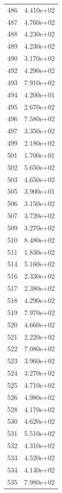 \documentclass[12pt]{article}
\begin{document}
\begin{longtable}{@{}cc@{}}
486 & 4.410e+02 \\
487 & 4.760e+02 \\
488 & 4.230e+02 \\
489 & 4.230e+02 \\
490 & 3.170e+02 \\
492 & 4.290e+02 \\
493 & 7.910e+02 \\
494 & 4.200e+01 \\
495 & 2.670e+02 \\
496 & 7.580e+02 \\
497 & 3.350e+02 \\
499 & 2.180e+02 \\
501 & 1.700e+01 \\
502 & 5.650e+02 \\
503 & 4.650e+02 \\
505 & 3.900e+01 \\
506 & 3.150e+02 \\
507 & 3.720e+02 \\
509 & 3.270e+02 \\
510 & 8.480e+02 \\
511 & 1.830e+02 \\
514 & 5.160e+02 \\
516 & 2.330e+02 \\
517 & 2.380e+02 \\
518 & 4.290e+02 \\
519 & 7.970e+02 \\
520 & 4.660e+02 \\
521 & 2.220e+02 \\
522 & 7.080e+02 \\
523 & 3.960e+02 \\
524 & 3.270e+02 \\
525 & 4.710e+02 \\
526 & 4.980e+02 \\
528 & 4.170e+02 \\
530 & 4.620e+02 \\
531 & 5.510e+02 \\
532 & 4.310e+02 \\
533 & 4.520e+02 \\
534 & 4.140e+02 \\
535 & 7.980e+02 \\

\bottomrule
\end{longtable}
\end{document}
